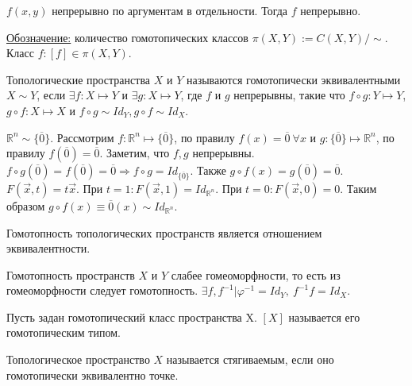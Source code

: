 
\begin{exercise}
    $f(x,y)$ непрерывно по аргументам в отдельности. Тогда $f$ непрерывно.
\end{exercise}

\underline{Обозначение:} количество гомотопических классов $\pi(X, Y) := C(X, Y) / \sim$. Класс $f: [f] \in \pi(X, Y)$.

\begin{definition}
    Топологические пространства $X$ и $Y$ называются гомотопически эквивалентными $X \sim Y$, если $\exists f: X \mapsto Y$ и $\exists g: X \mapsto Y$, где $f$ и $g$ непрерывны, такие что $f\circ g: Y \mapsto Y$, $g\circ f: X \mapsto X$ и $f \circ g \sim Id_Y, g \circ f \sim Id_X$. 
\end{definition}

\begin{example}
    $\mathbb{R}^n \sim \{\overline{0}\}$. Рассмотрим $f: \mathbb{R}^n \mapsto \{\overline{0}\}$, по правилу $f(x) = \overline{0}\ \forall x$  и $g:\{\overline{0}\} \mapsto \mathbb{R}^n$, по правилу $f(\overline{0}) = \overline{0}$. Заметим, что $f, g$ непрерывны. $f\circ g(\overline{0}) = f(\overline{0}) = \overline{0} \Rightarrow f\circ g = Id_{\{\overline{0}\}}$. Также $g\circ f(x) = g(\overline{0}) = \overline{0}$. $F(\overset{\rightarrow}{x}, t) = t\overset{\rightarrow}{x}$. При $t = 1: F(\overset{\rightarrow}{x}, 1) = Id_{\mathbb{R}^n }$. При $t = 0: F(\overset{\rightarrow}{x}, 0) = 0$. Таким образом $g\circ f(x) \equiv \overline{0}(x) \sim Id_{\mathbb{R}^n}$.  
\end{example}

\begin{statement}
    Гомотопность топологических пространств является отношением эквивалентности.
\end{statement}

\begin{nota_bene}
    Гомотопность пространств $X$ и $Y$ слабее гомеоморфности, то есть из гомеоморфности следует гомотопность. $\exists f, f^{-1} | \varphi^{-1} = Id_Y,\ f^{-1}f = Id_X$.   
\end{nota_bene}

\begin{definition}
    Пусть задан гомотопический класс пространства X. $[X]$ называется его гомотопическим типом.
\end{definition}

\begin{definition}
    Топологическое пространство $X$ называется стягиваемым, если оно гомотопически эквивалентно точке. 
\end{definition}

